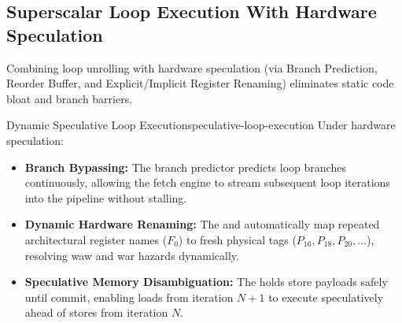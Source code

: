 \subsection{Superscalar Loop Execution With Hardware Speculation}
\label{subsec:unrolling_with_speculation}

Combining loop unrolling with hardware speculation (via Branch Prediction, Reorder Buffer, and Explicit/Implicit Register Renaming) eliminates static code bloat and branch barriers.

\begin{concept}{Dynamic Speculative Loop Execution}{speculative-loop-execution}
Under hardware speculation:
\begin{itemize}
    \item \textbf{Branch Bypassing:} The branch predictor predicts loop branches continuously, allowing the fetch engine to stream subsequent loop iterations into the pipeline without stalling.
    \item \textbf{Dynamic Hardware Renaming:} The  and  automatically map repeated architectural register names ($F_0$) to fresh physical tags ($P_{16}, P_{18}, P_{20}, \dots$), resolving \gls{waw} and \gls{war} hazards dynamically.
    \item \textbf{Speculative Memory Disambiguation:} The  holds store payloads safely until commit, enabling loads from iteration $N+1$ to execute speculatively ahead of stores from iteration $N$.
\end{itemize}
\end{concept}

